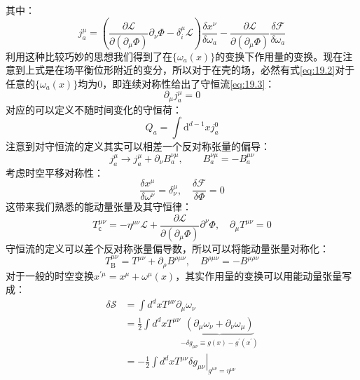 其中：
\begin{equation}\label{eq:19.3}
	\boxed{
		j_a^\mu=\left(\frac{\partial\mathcal{L}}{\partial(\partial_\mu\Phi)}\partial_\nu\Phi-\delta_i^\mu\mathcal{L}\right)\frac{\delta x^\nu}{\delta\omega_a}-\frac{\partial\mathcal{L}}{\partial(\partial_\mu\Phi)}\frac{\delta\mathcal{F}}{\delta\omega_a}
	}
\end{equation}
利用这种比较巧妙的思想我们得到了在$\{\omega_a(x)\}$的变换下作用量的变换。现在注意到上式是在场平衡位形附近的变分，所以对于在壳的场，必然有式\ref{eq:19.2}对于任意的$\{\omega_a(x)\}$均为0，即连续对称性给出了守恒流\ref{eq:19.3}：
\begin{equation}
	\boxed{\partial_\mu j^\mu_a=0}
\end{equation}
对应的可以定义不随时间变化的守恒荷：
\begin{equation}
	Q_a=\int\mathrm{d}^{d-1}xj_a^0
\end{equation}
注意到对守恒流的定义其实可以相差一个反对称张量的偏导：
\[
	j_a^\mu\to j_a^\mu+\partial_\nu B_a^{\nu\mu},\quad\quad B_a^{\nu\mu}=-B_a^{\mu\nu}
\]
考虑时空平移对称性：
\[	
	\frac{\delta x^\mu}{\delta\omega^\nu}=\delta^\mu_\nu,\quad\frac{\delta\mathcal{F}}{\delta\Phi}=0
\]
这带来我们熟悉的能动量张量及其守恒律：
\begin{equation}
	\boxed{
		T_\mathsf{c}^{\mu\nu}=-\eta^{\mu\nu}\mathcal{L}+\frac{\partial\mathcal{L}}{\partial(\partial_\mu\Phi)}\partial^\nu\Phi ,\quad \partial_\mu T^{\mu\nu}=0
	}
\end{equation}
守恒流的定义可以差个反对称张量偏导数，所以可以将能动量张量对称化：
\begin{equation}
	T_\mathrm{B}^{\mu\nu}=T^{\mu\nu}+\partial_\rho B^{\rho\mu\nu},\quad B^{\rho\mu\nu}=-B^{\mu\rho\nu}
\end{equation}
对于一般的时空变换$x^{\prime\mu}=x^\mu+\omega^\mu(x)$，其实作用量的变换可以用能动量张量写成：
\begin{equation}\label{eq:19.8}
	\begin{aligned}
	\delta\mathcal{S}&=\int d^dxT^{\mu\nu}\partial_{\mu}\omega_{\nu}\\
		&=\frac{1}{2}\int d^dxT^{\mu\nu}\underbrace{\left(\partial_{\mu}\omega_{\nu}+\partial_{\nu}\omega_{\mu}\right)}_{-\delta g_{\mu\nu}\equiv g(x)-{g^\prime}(x^\prime)}\\
		&=\left.-\frac{1}{2}\int d^dxT^{\mu\nu}\delta g_{\mu\nu}\right|_{g^{\mu\nu}=\eta^{\mu\nu}}
	\end{aligned}
\end{equation}

